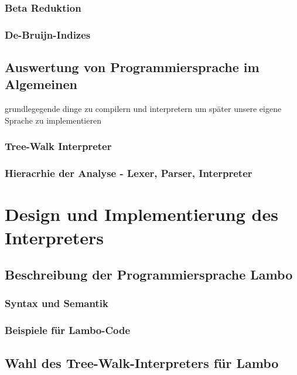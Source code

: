 \documentclass{article}
\begin{document}
\subsubsection{Beta Reduktion}

\subsubsection{De-Bruijn-Indizes}

\subsection{Auswertung von Programmiersprache im Algemeinen}

grundlegegende dinge zu compilern und interpretern um später unsere eigene Sprache zu implementieren

\subsubsection{Tree-Walk Interpreter}

\subsubsection{Hieracrhie der Analyse - Lexer, Parser, Interpreter}


\section{Design und Implementierung des Interpreters}

\subsection{Beschreibung der Programmiersprache Lambo}

\subsubsection{Syntax und Semantik}

\subsubsection{Beispiele für Lambo-Code}

\subsection{Wahl des Tree-Walk-Interpreters für Lambo}
\end{document}
